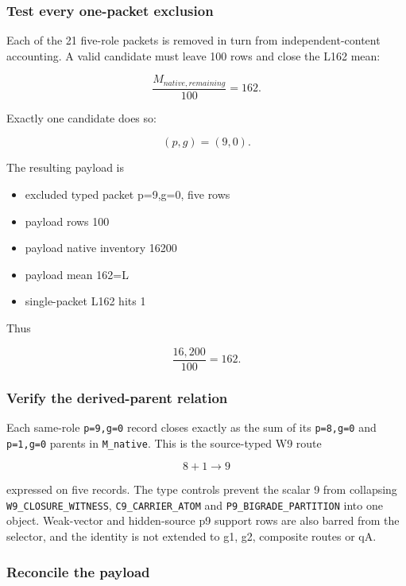 \subsubsection{Test every one-packet
exclusion}\label{viii-ch01-test-every-one-packet-exclusion}

Each of the 21 five-role packets is removed in turn from
independent-content accounting. A valid candidate must leave 100 rows
and close the L162 mean:

\[
\frac{M_{native,remaining}}{100}=162.
\]

Exactly one candidate does so:

\[
(p,g)=(9,0).
\]

The resulting payload is

\begin{itemize}
\tightlist
\item
  excluded typed packet p=9,g=0, five rows
\item
  payload rows 100
\item
  payload native inventory 16200
\item
  payload mean 162=L
\item
  single-packet L162 hits 1
\end{itemize}

Thus

\[
\frac{16{,}200}{100}=162.
\]

\subsubsection{Verify the derived-parent
relation}\label{viii-ch01-verify-the-derived-parent-relation}

Each same-role \texttt{p=9,g=0} record closes exactly as the sum of its
\texttt{p=8,g=0} and \texttt{p=1,g=0} parents in \texttt{M\_native}.
This is the source-typed W9 route

\[
8+1\to9
\]

expressed on five records. The type controls prevent the scalar 9 from
collapsing \texttt{W9\_CLOSURE\_WITNESS}, \texttt{C9\_CARRIER\_ATOM} and
\texttt{P9\_BIGRADE\_PARTITION} into one object. Weak-vector and
hidden-source p9 support rows are also barred from the selector, and the
identity is not extended to g1, g2, composite routes or qA.

\subsubsection{Reconcile the payload}\label{viii-ch01-reconcile-the-payload}

